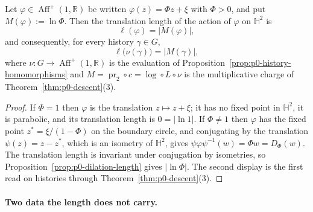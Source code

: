 \begin{proposition}
\label{prop:p0-length-multiplicative-charge}
Let $\varphi\in\operatorname{Aff}^{+}(1,\mathbb R)$ be written
$\varphi(z)=\Phi z+\xi$ with $\Phi>0$, and put $M(\varphi):=\ln\Phi$.  Then the
translation length of the action of $\varphi$ on $\mathbb H^2$ is
\begin{equation}\label{eq:p0-affine-length}
  \ell(\varphi)=\bigl\lvert M(\varphi)\bigr\rvert ,
\end{equation}
and consequently, for every history $\gamma\in G$,
\begin{equation}\label{eq:p0-history-length}
  \ell\bigl(\nu(\gamma)\bigr)=\bigl\lvert M(\gamma)\bigr\rvert ,
\end{equation}
where $\nu:G\to\operatorname{Aff}^{+}(1,\mathbb R)$ is the evaluation of
Proposition~\ref{prop:p0-history-homomorphisms} and
$M=\operatorname{pr}_2\circ c=\log\circ L\circ\nu$ is the multiplicative charge of
Theorem~\ref{thm:p0-descent}(3).
\end{proposition}

\begin{proof}
If $\Phi=1$ then $\varphi$ is the translation $z\mapsto z+\xi$; it has no fixed
point in $\mathbb H^2$, it is parabolic, and its translation length is
$0=\lvert\ln 1\rvert$.  If $\Phi\ne1$ then $\varphi$ has the fixed point
$z^{*}=\xi/(1-\Phi)$ on the boundary circle, and conjugating by the translation
$\psi(z)=z-z^{*}$, which is an isometry of $\mathbb H^2$, gives
$\psi\varphi\psi^{-1}(w)=\Phi w=D_\Phi(w)$.  The translation length is invariant
under conjugation by isometries, so
Proposition~\ref{prop:p0-dilation-length} gives $\lvert\ln\Phi\rvert$.  The second
display is the first read on histories through
Theorem~\ref{thm:p0-descent}(3).
\end{proof}

\paragraph{Two data the length does not carry.}


